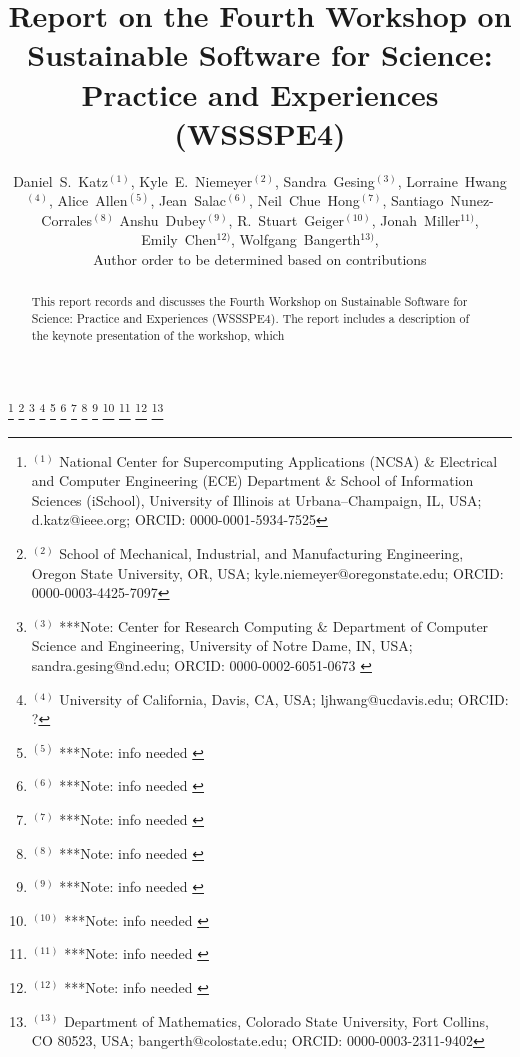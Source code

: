\documentclass[11pt, oneside]{amsart}
\newcommand{\note}[1]{ {\textcolor{blueish}    { ***Note:      #1 }}}
\begin{document}
\title[]{Report on the Fourth Workshop on Sustainable Software for Science: Practice and Experiences (WSSSPE4)}

\author{Daniel~S.~Katz$^{(1)}$,
Kyle~E.~Niemeyer$^{(2)}$,
Sandra~Gesing$^{(3)}$,
Lorraine~Hwang$^{(4)}$,
Alice~Allen$^{(5)}$,
Jean~Salac$^{(6)}$,
Neil~Chue~Hong$^{(7)}$,
Santiago~Nunez-Corrales$^{(8)}$
Anshu~Dubey$^{(9)}$,
R.~Stuart~Geiger$^(10)$,
Jonah~Miller$^{11)}$,
Emily~Chen$^{12)}$,
Wolfgang~Bangerth$^{13)}$,
\\Author order to be determined based on contributions
}

%
\thanks{{}$^{(1)}$ \hspace{-1ex}National Center for Supercomputing Applications (NCSA) \&
Electrical and Computer Engineering (ECE) Department \&
School of Information Sciences (iSchool),
University of Illinois at Urbana--Champaign, IL, USA; d.katz@ieee.org; ORCID: 0000-0001-5934-7525}
%
\thanks{{}$^{(2)}$ School of Mechanical, Industrial, and Manufacturing Engineering,
Oregon State University, OR, USA; kyle.niemeyer@oregonstate.edu; ORCID: 0000-0003-4425-7097}
%
\thanks{{}$^{(3)}$ \note{Center for Research Computing \& Department of Computer Science and Engineering,
University of Notre Dame, IN, USA; sandra.gesing@nd.edu; ORCID: 0000-0002-6051-0673}}
%
\thanks{{}$^{(4)}$ University of California, Davis, CA, USA; ljhwang@ucdavis.edu; ORCID: ?}
%
\thanks{{}$^{(5)}$ \note{info needed}}
%
\thanks{{}$^{(6)}$ \note{info needed}}
%
\thanks{{}$^{(7)}$ \note{info needed}}
%
\thanks{{}$^{(8)}$ \note{info needed}}
%
\thanks{{}$^{(9)}$ \note{info needed}}
%
\thanks{{}$^{(10)}$ \note{info needed}}
%
\thanks{{}$^{(11)}$ \note{info needed}}
%
\thanks{{}$^{(12)}$ \note{info needed}}
%
\thanks{{}$^{(13)}$ Department of Mathematics, Colorado State
  University, Fort Collins, CO 80523, USA; bangerth@colostate.edu; ORCID: 0000-0003-2311-9402}


\begin{abstract}
This report records and discusses the Fourth Workshop on Sustainable
Software for Science: Practice and Experiences (WSSSPE4). The report
includes a description of the keynote presentation of the workshop,
which %

\end{abstract}
\end{document}
